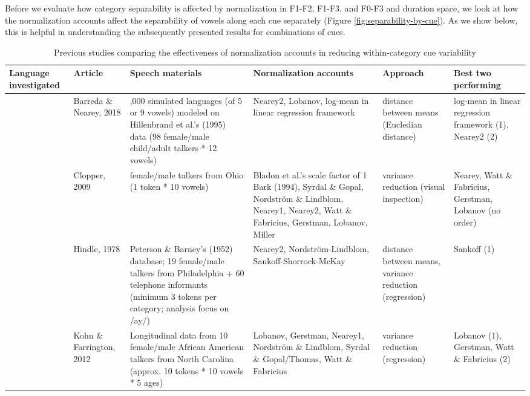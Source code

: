 \documentclass[utf8]{frontiers_suppmat} %
\begin{document}
Before we evaluate how category separability is affected by normalization in F1-F2, F1-F3, and F0-F3 and duration space, we look at how the normalization accounts affect the separability of vowels along each cue separately (Figure \ref{fig:separability-by-cue}). As we show below, this is helpful in understanding the subsequently presented results for combinations of cues.

\begin{landscape}\begin{table}

\caption{\label{tab:norm-evaluation-variability-SI}Previous studies comparing the effectiveness of normalization accounts in reducing within-category cue variability}
\centering
\fontsize{7}{9}\selectfont
\begin{tabular}[t]{>{\raggedright\arraybackslash}p{2cm}>{\raggedright\arraybackslash}p{2cm}>{\raggedright\arraybackslash}p{5.5cm}>{\raggedright\arraybackslash}p{6cm}>{\raggedright\arraybackslash}p{2.5cm}>{\raggedright\arraybackslash}p{2.5cm}}
\toprule
Language investigated & Article & Speech materials & Normalization accounts & Approach & Best two performing\\
\midrule
 & Barreda \& Nearey, 2018 & 120,000 simulated languages (of 5 or 9 vowels) modeled on Hillenbrand et al.'s (1995) data (98 female/male child/adult talkers * 12 vowels) & Nearey2, Lobanov, log-mean in linear regression framework & distance between means (Eucledian distance) & log-mean in linear regression framework (1), Nearey2 (2)\\
\cmidrule{2-6}
 & Clopper, 2009 & 2 female/male talkers from Ohio (1 token * 10 vowels) & Bladon et al.'s scale factor of 1 Bark (1994), Syrdal \& Gopal, Nordström \& Lindblom, Nearey1, Nearey2, Watt \& Fabricius, Gerstman, Lobanov, Miller & variance reduction (visual inspection) & Nearey, Watt \& Fabricius, Gerstman, Lobanov (no order)\\
\cmidrule{2-6}
 & Hindle, 1978 & Peterson \& Barney's (1952) database; 19 female/male talkers from Philadelphia + 60 telephone informants (minimum 3 tokens per category; analysis focus on /ay/) & Nearey2, Nordström-Lindblom, Sankoff-Shorrock-McKay & distance between means, variance reduction (regression) & Sankoff (1)\\
\cmidrule{2-6}
 & Kohn \& Farrington, 2012 & Longitudinal data from 10 female/male African American talkers from North Carolina (approx. 10 tokens * 10 vowels * 5 ages) & Lobanov, Gerstman, Nearey1, Nordström \& Lindblom, Syrdal \& Gopal/Thomas, Watt \& Fabricius & variance reduction (regression) & Lobanov (1), Gerstman, Watt \& Fabricius (2)\\

\end{tabular}
\end{table}
\end{landscape}
\end{document}
